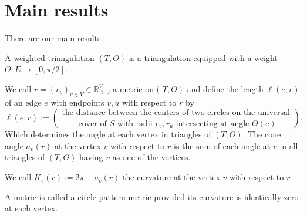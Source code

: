 %

\chapter{Main results}

There are our main results.

\begin{definition}
  \label{Weighted-triangulation}
  A weighted triangulation $(T, \Theta)$ is a triangulation equipped with a weight $\Theta : E → [0, \pi/2]$.
\end{definition}

\begin{definition}
  \label{Metric-Length-ConeAngle}
  We call $r=\left (r_{v}\right)_{v \in V} \in \mathbb{R}_{>0}^{V}$ a metric on ( $\left. T, \Theta\right)$ and define the length $\ell (e ; r)$ of an edge $e$ with endpoints $v, u$ with respect to $r$ by
  $$
  \ell(e ; r):=\binom{\text { the distance between the centers of two circles on the universal }}{\text { cover of } S \text { with radii } r_{v}, r_{u} \text { intersecting at angle } \Theta(e)},
  $$
  Which determines the angle at each vertex in triangles of $(T, \Theta)$. The cone angle $a_{v}(r)$ at the vertex $v$ with respect to $r$ is the sum of each angle at $v$ in all triangles of $(T, \Theta)$ having $v$ as one of the vertices.
\end{definition}

\begin{definition}
  \label{combinatorial-curvature}
  We call $K_v (r) := 2π − a_v (r)$ the curvature at the vertex $v$ with respect to $r$
\end{definition}

\begin{definition}
  \label{circle-pattern-metric}
  A metric is called a circle pattern metric provided its curvature is identically zero at each vertex.
\end{definition}

